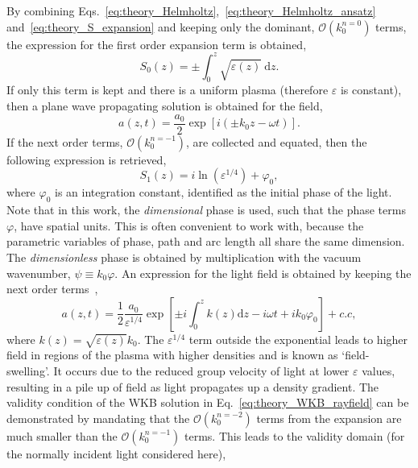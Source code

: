 By combining Eqs.~\ref{eq:theory_Helmholtz},~\ref{eq:theory_Helmholtz_ansatz} and~\ref{eq:theory_S_expansion} and keeping only the dominant, $\mathcal{O}\left(k_0^{n=0}\right)$ terms, the expression for the first order expansion term is obtained,
\begin{equation}
    S_0(z) = \pm \int_0^z \sqrt{\varepsilon(z)}\ \text{d}z.
\end{equation}
If only this term is kept and there is a uniform plasma (therefore $\varepsilon$ is constant), then a plane wave propagating solution is obtained for the field,
\begin{equation}
    a(z,t) = \frac{a_0}{2} \exp{\left[  i (\pm k_0 z - \omega t )\right]}.
\end{equation}
If the next order terms, $\mathcal{O}\left(k_0^{n=-1}\right)$, are collected and equated, then the following expression is retrieved,
\begin{equation}
    S_1(z) = i \ln{\left( \varepsilon^{1/4} \right)} + \varphi_0,
\end{equation}
where $\varphi_0$ is an integration constant, identified as the initial phase of the light.
Note that in this work, the \textit{dimensional} phase is used, such that the phase terms $\varphi$, have spatial units.
This is often convenient to work with, because the parametric variables of phase, path and arc length all share the same dimension.
The \textit{dimensionless} phase is obtained by multiplication with the vacuum wavenumber, $\psi \equiv k_0 \varphi$.
An expression for the light field is obtained by keeping the next order terms~\cite{michel_introduction_2023},
\begin{equation}
    \label{eq:theory_WKB_rayfield}
    a(z,t) = \frac{1}{2}\frac{a_0}{\varepsilon^{1/4}}\exp{ \left[ \pm i \int_0^z k(z) \text{d}z - i\omega t +ik_0\varphi_0 \right] } + c.c,
\end{equation}
where $k(z)=\sqrt{\varepsilon(z)}k_0$.
The $\varepsilon^{1/4}$ term outside the exponential leads to higher field in regions of the plasma with higher densities and is known as `field-swelling'.
It occurs due to the reduced group velocity of light at lower $\varepsilon$ values, resulting in a pile up of field as light propagates up a density gradient.
The validity condition of the WKB solution in Eq.~\ref{eq:theory_WKB_rayfield} can be demonstrated by mandating that the $\mathcal{O}\left(k_0^{n=-2}\right)$ terms from the expansion are much smaller than the $\mathcal{O}\left(k_0^{n=-1}\right)$ terms.
This leads to the validity domain (for the normally incident light considered here),
